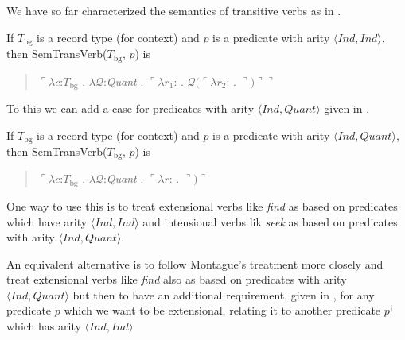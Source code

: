 We have so far characterized the semantics of transitive verbs as in
\nexteg{}.
\begin{ex} 
        If $T_{\text{bg}}$ is a record type (for context) and $p$ is a
        predicate with arity $\langle\textit{Ind},\textit{Ind}\rangle$, then SemTransVerb($T_{\mathrm{bg}}$, $p$) is
        \begin{quote}
          $\ulcorner\lambda c$:$T_{\mathrm{bg}}$ . $\lambda
          \mathcal{Q}$:\textit{Quant} . $\ulcorner\lambda
          r_1$: . $\mathcal{Q}(\ulcorner\lambda r_2$:
          . $\urcorner)\urcorner\urcorner$
        \end{quote} 
\end{ex} 
To this we can add a case for predicates with arity
$\langle\textit{Ind},\textit{Quant}\rangle$ given in \nexteg{}.
\begin{ex} 
  If $T_{\text{bg}}$ is a record type (for context) and $p$ is a
  predicate with arity $\langle\textit{Ind},\textit{Quant}\rangle$, then SemTransVerb($T_{\mathrm{bg}}$, $p$) is
  \begin{quote}
    $\ulcorner\lambda c$:$T_{\mathrm{bg}}$ . $\lambda
    \mathcal{Q}$:\textit{Quant} . $\ulcorner\lambda
    r$: . $\urcorner)\urcorner$
  \end{quote}  
\end{ex}
One way to use this is to treat extensional verbs like \textit{find}
as based on predicates which have arity
$\langle\textit{Ind},\textit{Ind}\rangle$ and intensional verbs lik
\textit{seek} as based on predicates with arity
$\langle\textit{Ind},\textit{Quant}\rangle$.

An equivalent alternative is to follow Montague's treatment more closely
and treat extensional verbs like \textit{find} also as based on
predicates with arity $\langle\textit{Ind},\textit{Quant}\rangle$
but then to have an additional requirement, given in \nexteg{}, for any predicate $p$
which we want to be extensional, relating it to another predicate
$p^{\dagger}$ which has arity $\langle\textit{Ind},\textit{Ind}\rangle$

  

 
